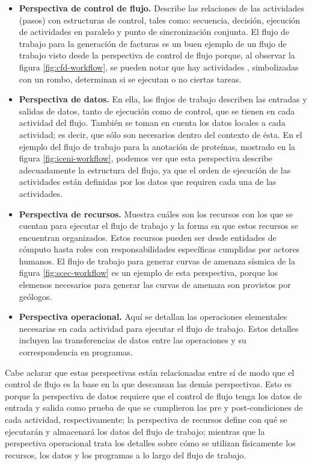 \begin{itemize}
\item{\textbf{Perspectiva de control de flujo.} Describe las relaciones de las actividades (pasos) con estructuras de control, tales como: secuencia, decisión, ejecución de actividades en paralelo y punto de sincronización conjunta. El flujo de trabajo para la generación de facturas es un buen ejemplo de un flujo de trabajo visto desde la perspectiva de control de flujo porque, al observar la figura \ref{fig:cfd-workflow}, se pueden notar que hay actividades , simbolizadas con un rombo, determinan si se ejecutan o no ciertas tareas.
}

\item{\textbf{Perspectiva de datos.} En ella, los flujos de trabajo describen las entradas y salidas de datos, tanto de ejecución como de control, que se tienen en cada actividad del flujo. También se toman en cuenta los datos locales a cada actividad; es decir, que sólo son necesarios dentro del contexto de ésta. En el ejemplo del flujo de trabajo para la anotación de proteínas, mostrado en la figura \ref{fig:iceni-workflow}, podemos ver que esta perspectiva describe adecuadamente la estructura del flujo, ya que el orden de ejecución de las actividades están definidas por los datos que requiren cada una de las actividades.}

\item{\textbf{Perspectiva de recursos.} Muestra cuáles son los recursos con los que se cuentan para ejecutar el flujo de trabajo y la forma en que estos recursos se encuentran organizados. Estos recursos pueden ser desde entidades de cómputo hasta roles con responsabilidades específicas cumplidas por actores humanos. El flujo de trabajo para generar curvas de amenaza sísmica de la figura \ref{fig:scec-workflow} es un ejemplo de esta perspectiva, porque los elemenos necesarios para generar las curvas de amenaza son provistos por geólogos.}

\item{\textbf{Perspectiva operacional.} Aquí se detallan las operaciones elementales necesarias en cada actividad para ejecutar el flujo de trabajo. Estos detalles incluyen las transferencias de datos entre las operaciones y su correspondencia en programas.}
\end{itemize}

Cabe aclarar que estas perspectivas están relacionadas entre sí de modo que el control de flujo es la base en la que descansan las demás perspectivas. Esto es porque la perspectiva de datos requiere que el control de flujo tenga los datos de entrada y salida como prueba de que se cumplieron las pre y post-condiciones de cada actividad, respectivamente; la perspectiva de recursos define con qué se ejecutarán y almacenará los datos del flujo de trabajo; mientras que la perspectiva operacional trata los detalles sobre cómo se utilizan físicamente los recursos, los datos y los programas a lo largo del flujo de trabajo.


